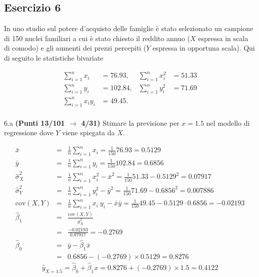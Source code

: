 \documentclass[
  11pt,
]{book}
\theoremstyle{mytheoremstyle}
\theoremstyle{mydefstyle}
\newenvironment{sol}
  {
  \begin{tcolorbox}[enhanced,breakable,arc=0.1mm,boxrule=1pt,colback=white,colframe=iblue,
  title=\bf \fontfamily{lmss}\selectfont \hspace{.5 cm} Soluzione,drop fuzzy shadow]

}{
\end{tcolorbox}
  }
\begin{document}
\subsection{Esercizio 6}\label{esercizio-6-18}

In uno studio sul potere d'acquisto delle famiglie è stato selezionato un campione di 150 nuclei familiari
a cui è stato chiesto il reddito annuo (\(X\) espressa in scala di comodo) e gli aumenti dei prezzi percepiti (\(Y\) espressa in opportuna scala). Qui di seguito le statistiche bivariate

\begin{align*}
\sum_{i=1}^n x_i &= 76.93,   &\sum_{i=1}^n x_i^2 &= 51.33 \\
\sum_{i=1}^n y_i &= 102.84,   &\sum_{i=1}^n y_i^2 &= 71.69 \\
\sum_{i=1}^n x_iy_i &= 49.45.    \\
\end{align*}

6.a \textbf{(Punti 13/101 \(\rightarrow\) 4/31)} Stimare la previsione per \(x=1.5\) nel modello di regressione dove \(Y\) viene spiegata da \(X\).

\begin{sol}
\begin{eqnarray*}
           \bar x &=&\frac 1 n\sum_{i=1}^n x_i = \frac {1}{ 150 }  76.93 =  0.5129 \\
           \bar y &=&\frac 1 n\sum_{i=1}^n y_i = \frac {1}{ 150 }  102.84 =  0.6856 \\
           \hat\sigma_X^2&=&\frac 1 n\sum_{i=1}^n x_i^2-\bar x^2=\frac {1}{ 150 }  51.33  - 0.5129 ^2= 0.07917 \\
           \hat\sigma_Y^2&=&\frac 1 n\sum_{i=1}^n y_i^2-\bar y^2=\frac {1}{ 150 }  71.69  - 0.6856 ^2= 0.007886 \\
           \text{cov}(X,Y)&=&\frac 1 n\sum_{i=1}^n x_i~y_i-\bar x\bar y=\frac {1}{ 150 }  49.45 - 0.5129 \cdot 0.6856 = -0.02193 \\
           \hat\beta_1 &=& \frac{\text{cov}(X,Y)}{\hat\sigma_X^2} \\
                    &=& \frac{ -0.02193 }{ 0.07917 }  =  -0.2769 \\
           \hat\beta_0 &=& \bar y - \hat\beta_1 \bar x\\
                    &=&  0.6856 - (-0.2769) \times  0.5129 = 0.8276 
         \end{eqnarray*}\[\hat y_{X= 1.5 }=\hat\beta_0+\hat\beta_1 x= 0.8276 + (-0.2769) \times 1.5 = 0.4122 \]

\end{sol}
\end{document}
